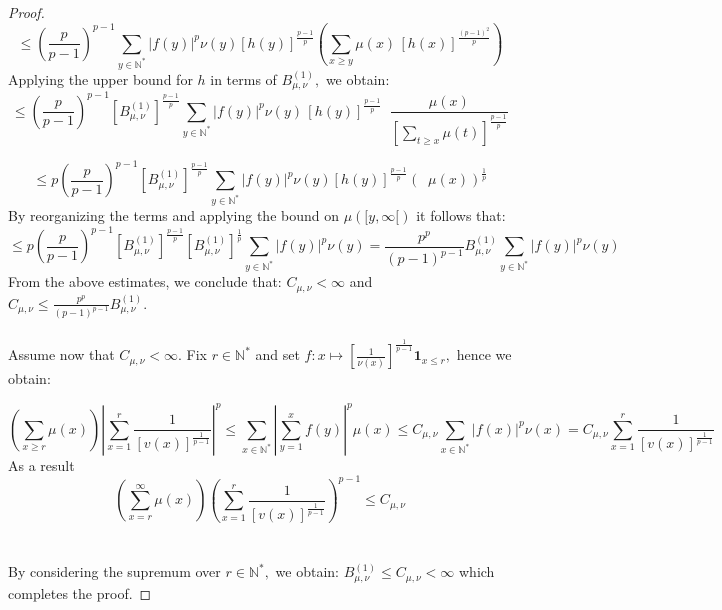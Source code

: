 \documentclass[11pt]{amsart}
\newcommand{\1}{[1]}
\begin{document}
\begin{proof}
$$\leq  \left( \frac{p}{p-1}\right)^{p-1} \sum_{y \in \mathbb{N}^{*}} |f(y)|^{p}\nu(y) [h(y)]^{\frac{p-1}{p}}   \left( \sum_{x \geq y} \mu(x) \, [h(x)]^{\frac{(p-1)^2}{p}} \right)$$
Applying the upper bound for $h$ in terms of $B_{\mu,\nu}^{(1)},$ we obtain:
$$\leq \left( \frac{p}{p-1}\right)^{p-1} [B_{\mu,\nu}^{(1)}]^{\frac{p-1}{p}}  \sum_{y \in \mathbb{N}^{*}} |f(y)|^{p}\nu(y) \,[h(y)]^{\frac{p-1}{p}} 
\mathop{\sum_{x\geq y}} \frac{\mu(x)}{\left[\displaystyle \sum_{t\geq x} \mu(t) \right] ^{\frac{p-1}{p}}}$$

$$\leq p \left( \frac{p}{p-1}\right)^{p-1}[B_{\mu,\nu}^{(1)}]^{\frac{p-1}{p}}  \sum_{y \in \mathbb{N}^{*}} |f(y)|^{p}\nu(y) [h(y)]^{\frac{p-1}{p}}
\left( \mathop{\sum_{x\geq y}} \mu(x) \right)^{\frac{1}{p}}$$
By reorganizing the terms and applying the bound on $\mu([y,\infty[)$ it follows that:
$$\leq  p \left( \frac{p}{p-1}\right)^{p-1} [B_{\mu,\nu}^{(1)}]^{\frac{p-1}{p}}  [B_{\mu,\nu}^{(1)}]^{\frac{1}{p}}  \sum_{y \in \mathbb{N}^{*}} |f(y)|^{p}\nu(y) = \frac{p^{p}}{(p-1)^{p-1}}  B_{\mu,\nu}^{(1)}   \sum_{y \in \mathbb{N}^{*}} |f(y)|^{p}\nu(y) $$
From the above estimates, we conclude that: $C_{\mu,\nu} < \infty$ and $ C_{\mu,\nu} \leq \frac{p^{p}}{(p-1)^{p-1}}  B_{\mu,\nu}^{(1)}.$  \\ \\
Assume now that $C_{\mu,\nu} < \infty .$ Fix $r \in \mathbb{N}^{*}$ and set 
$f: x \mapsto \left[\frac{1}{\nu(x)}\right]^{\frac{1}{p-1}} \mathbf{1}_{x\le r},$ hence we obtain:

$$\left(\sum_{x \geq r} \mu(x) \right)\left| \sum_{x=1}^{r} \frac{1}{[v(x)]^{\frac{1}{p-1}}} \right|^p\leq \sum_{x \in \mathbb{N}^{*}} \left|\sum_{y=1}^{x} f(y) \right|^{p} \mu(x) \leq  C_{\mu,\nu}\sum_{x \in \mathbb{N}^{*}} |f(x)|^p \nu(x) = C_{\mu,\nu} \sum_{x=1}^{r} \frac{1}{[v(x)]^{\frac{1}{p-1}}}$$
As a result
$$\left(\sum_{x=r}^{\infty} \mu(x) \right)
\left( \sum_{x=1}^{r} \frac{1}{[v(x)]^{\frac{1}{p-1}}} \right)^{p-1} \leq  C_{\mu,\nu} $$
\phantom{.} \\ \\
By considering the supremum over $r \in\mathbb{N}^{*},$ we obtain: $B_{\mu,\nu}^{(1)} \leq C_{\mu,\nu} < \infty$ which completes the proof.
\end{proof}
 
\end{document}
